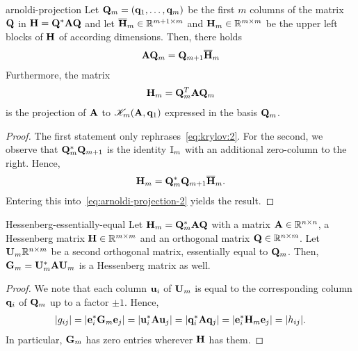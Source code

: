 \begin{Theorem}{arnoldi-projection}
  Let $\mathbf Q_m = (\mathbf q_1,\dots,\mathbf q_m)$ be the first $m$ columns of the
  matrix $\mathbf Q$ in $\mathbf H = \mathbf Q^*\mathbf A\mathbf Q$ and let
  $\overline{\mathbf H}_m\in\mathbb R^{m+1\times m}$ and
  $\mathbf H_m\in\mathbb R^{m\times m}$ be the upper left blocks of $\mathbf H$ of
  according dimensions. Then, there holds
  \begin{gather}
    \label{eq:arnoldi-projection-2}
    \mathbf A\mathbf Q_m
    = \mathbf Q_{m+1}\overline{\mathbf H}_m
  \end{gather}
  Furthermore, the matrix
  \begin{gather}
    \label{eq:arnoldi-projection-3}
    \mathbf H_m = \mathbf Q_m^T\mathbf A\mathbf Q_m
  \end{gather}
  is the projection of $\mathbf A$ to $\mathscr K_m(\mathbf A,\mathbf q_1)$ expressed
  in the basis $\mathbf Q_m$.
\end{Theorem}

\begin{proof}
  The first statement only rephrases~\eqref{eq:krylov:2}. For the
  second, we observe that $\mathbf Q_m^*\mathbf Q_{m+1}$ is the identity
  $\mathbb I_m$ with an additional zero-column to the right. Hence,
  \begin{gather}
    \mathbf H_m = \mathbf Q_m^*\mathbf Q_{m+1}\overline{\mathbf H}_{m}.
  \end{gather}
  Entering this into~\eqref{eq:arnoldi-projection-2} yields the result.
\end{proof}

\begin{Lemma}{Hessenberg-essentially-equal}
  Let $\mathbf H_m = \mathbf Q_m^*\mathbf A\mathbf Q$ with a matrix $\mathbf A\in\mathbb R^{n\times n}$, a
  Hessenberg matrix $\mathbf H\in\mathbb R^{m\times m}$ and an orthogonal matrix
  $\mathbf Q\in\mathbb R^{n\times m}$. Let $\mathbf U_m\mathbb R^{n\times m}$ be a second
  orthogonal matrix, essentially equal to $\mathbf Q_m$. Then,
  $\mathbf G_m = \mathbf U_m^*\mathbf A\mathbf U_m$ is a Hessenberg matrix as well.
\end{Lemma}

\begin{proof}
  We note that each column $\mathbf u_i$ of $\mathbf U_m$ is equal to the
  corresponding column $\mathbf q_i$ of $\mathbf Q_m$ up to a factor $\pm 1$. Hence,
  \begin{gather}
    \lvert g_{ij}\rvert = \lvert\mathbf e_i^*\mathbf G_m\mathbf e_j\rvert
    = \lvert\mathbf u_i^*\mathbf A\mathbf u_j\rvert
    = \lvert\mathbf q_i^*\mathbf A\mathbf q_j\rvert
    = \lvert\mathbf e_i^*\mathbf H_m\mathbf e_j\rvert
    = \lvert h_{ij}\rvert.
  \end{gather}
  In particular, $\mathbf G_m$ has zero entries wherever $\mathbf H$ has them.
\end{proof}

